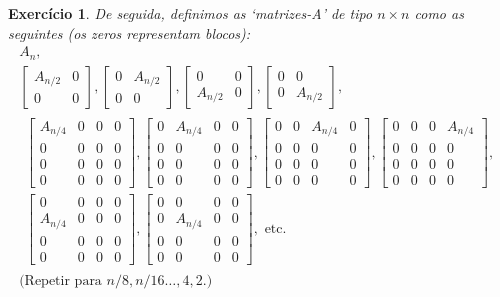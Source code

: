 \documentclass{article}
\newtheorem{ex}{Exercício}
\begin{document}
\begin{ex}
De seguida, definimos as `matrizes-A' de tipo $n \times n$ como as seguintes (os zeros representam blocos):
\begin{gather*}
A_n,\\
\begin{bmatrix}
A_{n/2} & 0\\
0 & 0
\end{bmatrix},
\begin{bmatrix}
0 & A_{n/2}\\
0 & 0
\end{bmatrix},
\begin{bmatrix}
0 & 0\\
A_{n/2} & 0
\end{bmatrix},
\begin{bmatrix}
0 & 0\\
0 & A_{n/2}
\end{bmatrix},\\
\begin{multlined}
\begin{bmatrix}
A_{n/4} & 0 & 0 & 0\\
0 & 0 & 0 & 0\\
0 & 0 & 0 & 0\\
0 & 0 & 0 & 0
\end{bmatrix},
\begin{bmatrix}
0 & A_{n/4} & 0 & 0\\
0 & 0 & 0 & 0\\
0 & 0 & 0 & 0\\
0 & 0 & 0 & 0
\end{bmatrix},
\begin{bmatrix}
0 & 0 & A_{n/4} & 0\\
0 & 0 & 0 & 0\\
0 & 0 & 0 & 0\\
0 & 0 & 0 & 0
\end{bmatrix},
\begin{bmatrix}
0 & 0 & 0 & A_{n/4}\\
0 & 0 & 0 & 0\\
0 & 0 & 0 & 0\\
0 & 0 & 0 & 0
\end{bmatrix},\\
\begin{bmatrix}
0 & 0 & 0 & 0\\
A_{n/4} & 0 & 0 & 0\\
0 & 0 & 0 & 0\\
0 & 0 & 0 & 0
\end{bmatrix},
\begin{bmatrix}
0 & 0 & 0 & 0\\
0 & A_{n/4} & 0 & 0\\
0 & 0 & 0 & 0\\
0 & 0 & 0 & 0
\end{bmatrix}, \text{ etc.}
\end{multlined}\\
\text{(Repetir para $n/8, n/16 \dots, 4, 2.$)}
\end{gather*}


\end{ex}
\end{document}

